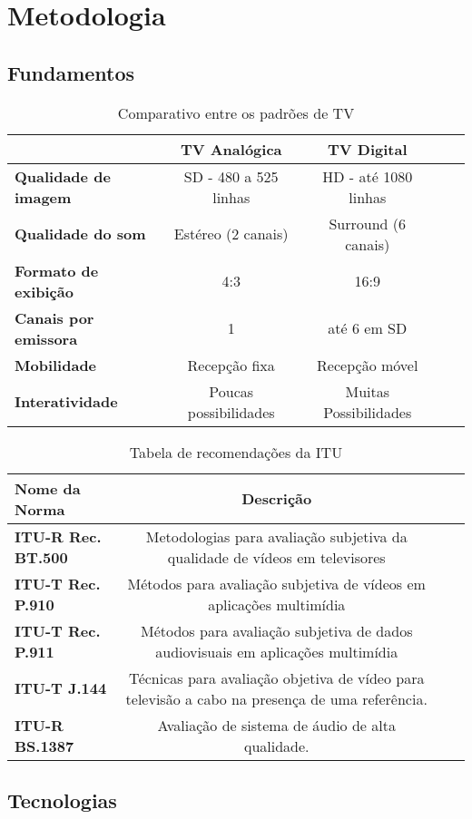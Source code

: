 \chapter{Metodologia}

\section{Fundamentos}

\begin{table}[!htb]
	\centering
	\caption{Comparativo entre os padrões de TV}
	\begin{tabular}{lcccc}
		\hline
		& \textbf{TV Analógica} & \textbf{TV Digital} \\
		\hline
		\textbf{Qualidade de imagem} & SD - 480 a 525 linhas & HD - até 1080 linhas \\
		\textbf{Qualidade do som} & Estéreo (2 canais) & Surround (6 canais) \\
		\textbf{Formato de exibição} & 4:3 & 16:9 \\
		\textbf{Canais por emissora} & 1 & até 6 em SD \\
		\textbf{Mobilidade} & Recepção fixa & Recepção móvel \\
		\textbf{Interatividade} & Poucas possibilidades & Muitas Possibilidades \\
		\hline
	\end{tabular}
\end{table}

\begin{table}
	\centering
	\caption{Tabela de recomendações da ITU}
	\begin{tabular}{lccc}
		\hline
		\textbf{Nome da Norma} & Descrição \\
		\hline
		\textbf{ITU-R Rec. BT.500} & Metodologias para avaliação subjetiva da qualidade de vídeos em televisores \\
		\textbf{ITU-T Rec. P.910} & Métodos para avaliação subjetiva de vídeos em aplicações multimídia \\
		\textbf{ITU-T Rec. P.911} & Métodos para avaliação subjetiva de dados audiovisuais em aplicações multimídia \\
		\textbf{ITU-T J.144} & Técnicas para avaliação objetiva de vídeo para televisão a cabo na presença de uma referência. \\
		\textbf{ITU-R BS.1387} & Avaliação de sistema de áudio de alta qualidade. \\
		\hline
	\end{tabular}
\end{table}

\section{Tecnologias}
